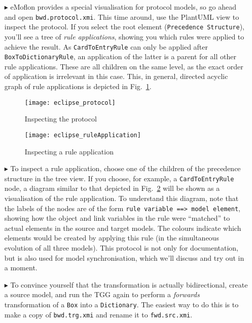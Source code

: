 \begin{itemize}
\item[$\blacktriangleright$] eMoflon provides a special visualisation for protocol models, so go ahead and open \texttt{bwd.protocol.xmi}.
This time around, use the PlantUML view to inspect the protocol.
If you select the root element (\texttt{Precedence Structure}), you'll see a tree of \emph{rule applications}, showing you which rules were applied to achieve the result.
As \texttt{Card\-To\-Entry\-Rule} can only be applied after \texttt{BoxToDictionaryRule}, an application of the latter is a parent for all other rule applications.
These are all children on the same level, as the exact order of application is irrelevant in this case.
This, in general, directed acyclic graph of rule applications is depicted in Fig.~\ref{eclipse_protocol}.
 
\begin{figure}[htb]
\begin{center}
  \texttt{[image: eclipse\_protocol]}
  \caption{Inspecting the protocol}
  \label{eclipse_protocol}
\end{center}
\end{figure}

\begin{figure}[htb]
\begin{center}
  \texttt{[image: eclipse\_ruleApplication]}
  \caption{Inspecting a rule application}
  \label{eclipse_ruleApplication}
\end{center}
\end{figure}

\item[$\blacktriangleright$] To inspect a rule application, choose one of the children of the precedence structure in the tree view.
If you choose, for example, a \texttt{Card\-To\-Entry\-Rule} node, a diagram similar to that depicted in Fig.~\ref{eclipse_ruleApplication} will be shown as a visualisation of the rule application.
To understand this diagram, note that the labels of the nodes are of the form \texttt{rule variable ==> model element}, showing how the object and link variables in the rule were ``matched'' to actual elements in the source and target models.
The colours indicate which elements would be created by applying this rule (in the simultaneous evolution of all three models).
This protocol is not only for documentation, but is also used for model synchronisation, which we'll discuss and try out in a moment.

\item[$\blacktriangleright$] To convince yourself that the transformation is actually bidirectional, create a source model, and run the TGG again to perform a \emph{forwards} transformation of a \texttt{Box} into a \texttt{Dictionary}.
The easiest way to do this is to make a copy of \texttt{bwd.trg.xmi} and rename
it to \texttt{fwd.src.xmi}.


\end{itemize}
